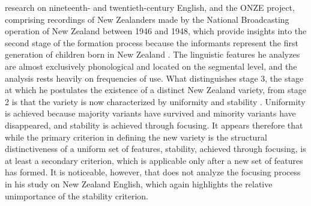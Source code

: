 research on nineteenth- and twentieth-century English, and the ONZE project, comprising recordings of New Zealanders made by the National Broadcasting operation of New Zealand between 1946 and 1948, which provide insights into the second stage of the formation process because the informants represent the first generation of children born in New Zealand \citep[33]{Trudgill2004}. The linguistic features he analyzes are almost exclusively phonological and located on the segmental level, and the analysis rests heavily on frequencies of use. What distinguishes stage 3, the stage at which he postulates the existence of a distinct New Zealand variety, from stage 2 is that the variety is now characterized by uniformity and stability \citep[113]{Trudgill2004}. Uniformity is achieved because majority variants have survived and minority variants have disappeared, and stability is achieved through focusing. It appears therefore that while the primary criterion in defining the new variety is the structural distinctiveness of a uniform set of features, stability, achieved through focusing, is at least a secondary criterion, which is applicable only after a new set of features has formed. It is noticeable, however, that \citet{Trudgill2004} does not analyze the focusing process in his study on New Zealand English, which again highlights the relative unimportance of the stability criterion.


